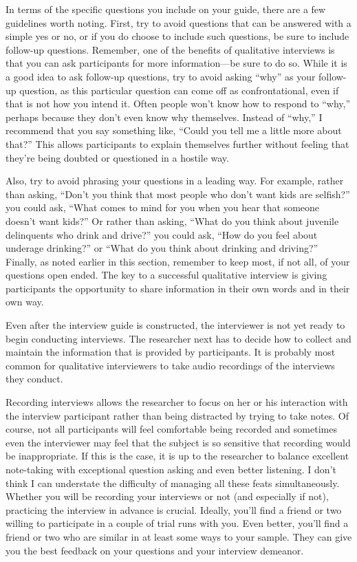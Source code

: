 In terms of the specific questions you include on your guide, there are a few guidelines worth noting. First, try to avoid questions that can be answered with a simple yes or no, or if you do choose to include such questions, be sure to include follow-up questions. Remember, one of the benefits of qualitative interviews is that you can ask participants for more information—be sure to do so. While it is a good idea to ask follow-up questions, try to avoid asking “why” as your follow-up question, as this particular question can come off as confrontational, even if that is not how you intend it. Often people won’t know how to respond to “why,” perhaps because they don’t even know why themselves. Instead of “why,” I recommend that you say something like, “Could you tell me a little more about that?” This allows participants to explain themselves further without feeling that they’re being doubted or questioned in a hostile way.

Also, try to avoid phrasing your questions in a leading way. For example, rather than asking, “Don’t you think that most people who don’t want kids are selfish?” you could ask, “What comes to mind for you when you hear that someone doesn’t want kids?” Or rather than asking, “What do you think about juvenile delinquents who drink and drive?” you could ask, “How do you feel about underage drinking?” or “What do you think about drinking and driving?” Finally, as noted earlier in this section, remember to keep most, if not all, of your questions open ended. The key to a successful qualitative interview is giving participants the opportunity to share information in their own words and in their own way.

Even after the interview guide is constructed, the interviewer is not yet ready to begin conducting interviews. The researcher next has to decide how to collect and maintain the information that is provided by participants. It is probably most common for qualitative interviewers to take audio recordings of the interviews they conduct.

Recording interviews allows the researcher to focus on her or his interaction with the interview participant rather than being distracted by trying to take notes. Of course, not all participants will feel comfortable being recorded and sometimes even the interviewer may feel that the subject is so sensitive that recording would be inappropriate. If this is the case, it is up to the researcher to balance excellent note-taking with exceptional question asking and even better listening. I don’t think I can understate the difficulty of managing all these feats simultaneously. Whether you will be recording your interviews or not (and especially if not), practicing the interview in advance is crucial. Ideally, you’ll find a friend or two willing to participate in a couple of trial runs with you. Even better, you’ll find a friend or two who are similar in at least some ways to your sample. They can give you the best feedback on your questions and your interview demeanor.

